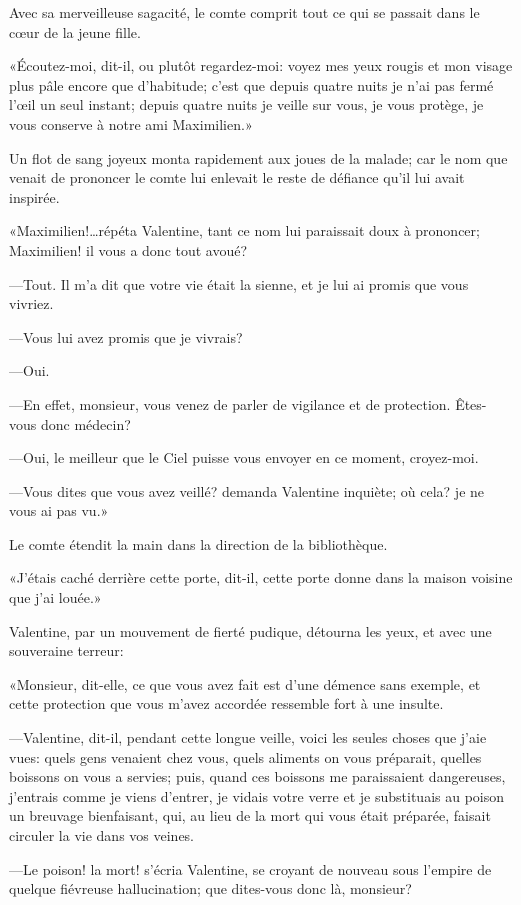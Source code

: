 Avec sa merveilleuse sagacité, le comte comprit tout ce qui se passait dans le cœur de la jeune fille. 

«Écoutez-moi, dit-il, ou plutôt regardez-moi: voyez mes yeux rougis et mon visage plus pâle encore que d'habitude; c'est que depuis quatre nuits je n'ai pas fermé l'œil un seul instant; depuis quatre nuits je veille sur vous, je vous protège, je vous conserve à notre ami Maximilien.» 

Un flot de sang joyeux monta rapidement aux joues de la malade; car le nom que venait de prononcer le comte lui enlevait le reste de défiance qu'il lui avait inspirée. 

«Maximilien!\dots répéta Valentine, tant ce nom lui paraissait doux à prononcer; Maximilien! il vous a donc tout avoué? 

—Tout. Il m'a dit que votre vie était la sienne, et je lui ai promis que vous vivriez. 

—Vous lui avez promis que je vivrais? 

—Oui. 

—En effet, monsieur, vous venez de parler de vigilance et de protection. Êtes-vous donc médecin? 

—Oui, le meilleur que le Ciel puisse vous envoyer en ce moment, croyez-moi. 

—Vous dites que vous avez veillé? demanda Valentine inquiète; où cela? je ne vous ai pas vu.» 

Le comte étendit la main dans la direction de la bibliothèque. 

«J'étais caché derrière cette porte, dit-il, cette porte donne dans la maison voisine que j'ai louée.» 

Valentine, par un mouvement de fierté pudique, détourna les yeux, et avec une souveraine terreur: 

«Monsieur, dit-elle, ce que vous avez fait est d'une démence sans exemple, et cette protection que vous m'avez accordée ressemble fort à une insulte. 

—Valentine, dit-il, pendant cette longue veille, voici les seules choses que j'aie vues: quels gens venaient chez vous, quels aliments on vous préparait, quelles boissons on vous a servies; puis, quand ces boissons me paraissaient dangereuses, j'entrais comme je viens d'entrer, je vidais votre verre et je substituais au poison un breuvage bienfaisant, qui, au lieu de la mort qui vous était préparée, faisait circuler la vie dans vos veines. 

—Le poison! la mort! s'écria Valentine, se croyant de nouveau sous l'empire de quelque fiévreuse hallucination; que dites-vous donc là, monsieur? 

